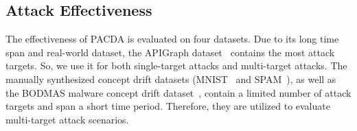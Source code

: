 \documentclass[conference,compsoc]{IEEEtran} %
\begin{document}
\subsection{Attack Effectiveness}
\label{Sec: Attack Effectiveness}
The effectiveness of PACDA is evaluated on four datasets.
Due to its long time span and real-world dataset, the APIGraph dataset~\cite{2020-CCS-APIGraph} contains the most attack targets. 
So, we use it for both single-target attacks and multi-target attacks.
The manually synthesized concept drift datasets (MNIST~\cite{2017-MINIST-dataset} and SPAM~\cite{2010-Spam-Emali-dataset}), as well as the BODMAS malware concept drift dataset~\cite{2021-PE-malware-dataset}, contain a limited number of attack targets and span a short time period.
Therefore, they are utilized to evaluate multi-target attack scenarios.
\end{document}
